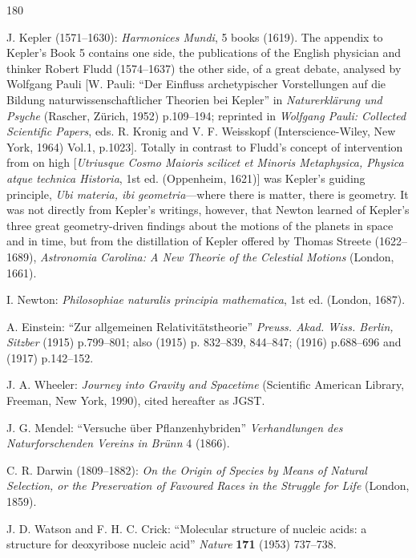 \documentclass[11pt]{article}
\begin{document}
	\begin{thebibliography}{180}
		
		J. Kepler (1571--1630): \emph{Harmonices Mundi}, 5 books (1619). The appendix to Kepler's Book 5 contains one side, the publications of the English physician and thinker Robert Fludd (1574--1637) the other side, of a great debate, analysed by Wolfgang Pauli [W. Pauli: ``Der Einfluss archetypischer Vorstellungen auf die Bildung naturwissenschaftlicher Theorien bei Kepler'' in \emph{Naturerkl\"arung und Psyche} (Rascher, Z\"urich, 1952) p.109--194; reprinted in \emph{Wolfgang Pauli: Collected Scientific Papers}, eds. R. Kronig and V. F. Weisskopf (Interscience-Wiley, New York, 1964) Vol.1, p.1023]. Totally in contrast to Fludd's concept of intervention from on high [\emph{Utriusque Cosmo Maioris scilicet et Minoris Metaphysica, Physica atque technica Historia}, 1st ed. (Oppenheim, 1621)] was Kepler's guiding principle, \emph{Ubi materia, ibi geometria}---where there is matter, there is geometry. It was not directly from Kepler's writings, however, that Newton learned of Kepler's three great geometry-driven findings about the motions of the planets in space and in time, but from the distillation of Kepler offered by Thomas Streete (1622--1689), \emph{Astronomia Carolina: A New Theorie of the Celestial Motions} (London, 1661).
		
		I. Newton: \emph{Philosophiae naturalis principia mathematica}, 1st ed. (London, 1687).
		
		A. Einstein: ``Zur allgemeinen Relativit\"atstheorie'' \emph{Preuss. Akad. Wiss. Berlin, Sitzber} (1915) p.799--801; also (1915) p. 832--839, 844--847; (1916) p.688--696 and (1917) p.142--152.
		
		J. A. Wheeler: \emph{Journey into Gravity and Spacetime} (Scientific American Library, Freeman, New York, 1990), cited hereafter as JGST.
		
		J. G. Mendel: ``Versuche \"uber Pflanzenhybriden'' \emph{Verhandlungen des Naturforschenden Vereins in Br\"unn} 4 (1866).
		
		C. R. Darwin (1809--1882): \emph{On the Origin of Species by Means of Natural Selection, or the Preservation of Favoured Races in the Struggle for Life} (London, 1859).
		
		J. D. Watson and F. H. C. Crick: ``Molecular structure of nucleic acids: a structure for deoxyribose nucleic acid'' \emph{Nature} \textbf{171} (1953) 737--738.
		

\end{thebibliography}
\end{document}
